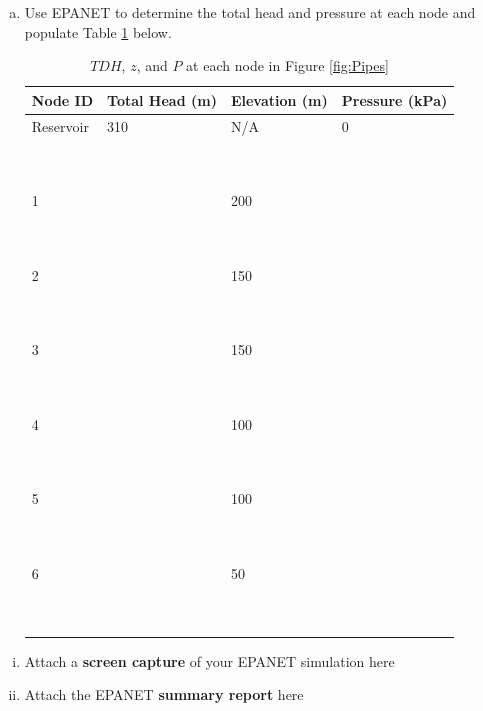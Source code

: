 \documentclass[12pt]{article}
\begin{document}
\begin{enumerate}
\begin{enumerate}[a)]
\clearpage
\item Use EPANET to determine the total head and pressure at each node and populate Table \ref{tab:booktabs} below.
\begin{table}[htbp]
      \caption{$TDH$, $z$,  and $P$ at  each node in Figure \ref{fig:Pipes} \\}
   \begin{tabular}{| p{1in} | p{1.1in} | p{1in} | p{1.1in} | } %
   \hline
   \hline
Node ID & Total Head (m) & Elevation (m) & Pressure (kPa) \\
\hline
\hline
Reservoir & 310 & N/A & 0  \\
~ & ~ & ~ & ~  \\
~ & ~ & ~ & ~  \\
\hline
1 & ~ & 200 & ~  \\
~ & ~ & ~ & ~  \\
~ & ~ & ~ & ~  \\
\hline
2 & ~ & 150 & ~  \\
~ & ~ & ~ & ~  \\
~ & ~ & ~ & ~  \\
\hline
3 & ~ & 150 & ~  \\
~ & ~ & ~ & ~  \\
~ & ~ & ~ & ~  \\
\hline
4 & ~ & 100 & ~  \\
~ & ~ & ~ & ~  \\
~ & ~ & ~ & ~  \\
\hline
5 & ~ & 100 & ~  \\
~ & ~ & ~ & ~  \\
~ & ~ & ~ & ~  \\
\hline
6 & ~ & 50 & ~  \\
~ & ~ & ~ & ~  \\
~ & ~ & ~ & ~  \\
\hline
\hline

   \end{tabular}

   \label{tab:booktabs}
\end{table}
\end{enumerate}
\clearpage

\begin{enumerate}[i)]
\item Attach a \textbf{screen capture} of your EPANET simulation here ~\clearpage
\item Attach the EPANET \textbf{summary report} here
\end{enumerate}


\end{enumerate}
\end{document}
